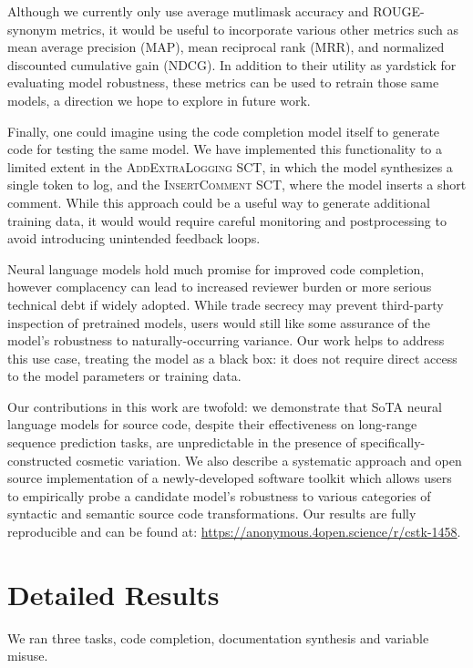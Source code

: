 \documentclass[usenames,dvipsnames]{article} %
\begin{document}
  Although we currently only use average mutlimask accuracy and ROUGE-synonym metrics, it would be useful to incorporate various other metrics such as mean average precision (MAP), mean reciprocal rank (MRR), and normalized discounted cumulative gain (NDCG). In addition to their utility as yardstick for evaluating model robustness, these metrics can be used to retrain those same models, a direction we hope to explore in future work.

  Finally, one could imagine using the code completion model itself to generate code for testing the same model. We have implemented this functionality to a limited extent in the \textsc{AddExtraLogging} SCT, in which the model synthesizes a single token to log, and the \textsc{InsertComment} SCT, where the model inserts a short comment. While this approach could be a useful way to generate additional training data, it would would require careful monitoring and postprocessing to avoid introducing unintended feedback loops.

  Neural language models hold much promise for improved code completion, however complacency can lead to increased reviewer burden or more serious technical debt if widely adopted. While trade secrecy may prevent third-party inspection of pretrained models, users would still like some assurance of the model's robustness to naturally-occurring variance. Our work helps to address this use case, treating the model as a black box: it does not require direct access to the model parameters or training data.

  Our contributions in this work are twofold: we demonstrate that SoTA neural language models for source code, despite their effectiveness on long-range sequence prediction tasks, are unpredictable in the presence of specifically-constructed cosmetic variation. We also describe a systematic approach and open source implementation of a newly-developed software toolkit which allows users to empirically probe a candidate model's robustness to various categories of syntactic and semantic source code transformations. Our results are fully reproducible and can be found at: \url{https://anonymous.4open.science/r/cstk-1458}.

  \pagebreak
  
  \pagebreak
  \appendix
  \section{Detailed Results}\label{sec:detailed_results}
  We ran three tasks, code completion, documentation synthesis and variable misuse.
\end{document}
